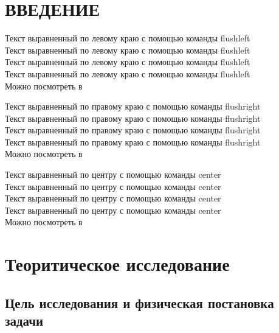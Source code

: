 \documentclass[14pt]{article}
\begin{document}
\newpage
\begin{center}
\renewcommand{\contentsname}{Содержание}
\tableofcontents
\newpage
\end{center}
 
\newpage
\section{ВВЕДЕНИЕ}

\begin{flushleft}
    Текст выравненный по левому краю с помощью команды flushleft\\
    Текст выравненный по левому краю с помощью команды flushleft\\
    Текст выравненный по левому краю с помощью команды flushleft\\
    Текст выравненный по левому краю с помощью команды flushleft\\
    Можно посмотреть в \cite{Reference1}\\
\end{flushleft}

\begin{flushright}
    Текст выравненный по правому краю с помощью команды flushright\\
    Текст выравненный по правому краю с помощью команды flushright\\
    Текст выравненный по правому краю с помощью команды flushright\\
    Текст выравненный по правому краю с помощью команды flushright\\
    Можно посмотреть в \cite{Reference2}\\
\end{flushright}

\begin{center}
    Текст выравненный по центру с помощью команды center\\
    Текст выравненный по центру с помощью команды center\\
    Текст выравненный по центру с помощью команды center\\
    Текст выравненный по центру с помощью команды center\\
    Можно посмотреть в \cite{Reference3}\\
\end{center}
\newpage
\section{Теоритическое исследование}
\subsection{Цель исследования и физическая постановка задачи}
\end{document}
